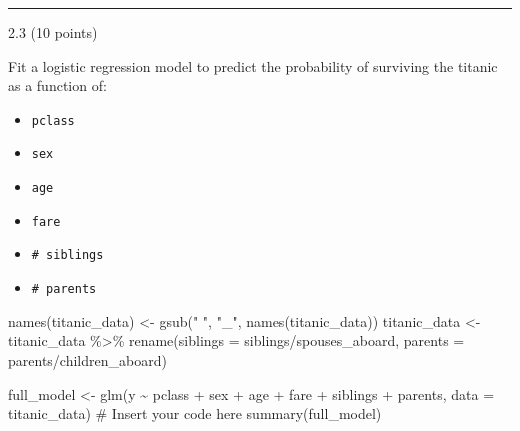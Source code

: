 \documentclass[
  letterpaper,
  DIV=11,
  numbers=noendperiod]{scrartcl}
\newenvironment{Shaded}{\begin{snugshade}}{\end{snugshade}}
\newcommand{\AttributeTok}[1]{\textcolor[rgb]{0.40,0.45,0.13}{#1}}
\newcommand{\CommentTok}[1]{\textcolor[rgb]{0.37,0.37,0.37}{#1}}
\newcommand{\FunctionTok}[1]{\textcolor[rgb]{0.28,0.35,0.67}{#1}}
\newcommand{\NormalTok}[1]{\textcolor[rgb]{0.00,0.23,0.31}{#1}}
\newcommand{\OtherTok}[1]{\textcolor[rgb]{0.00,0.23,0.31}{#1}}
\newcommand{\SpecialCharTok}[1]{\textcolor[rgb]{0.37,0.37,0.37}{#1}}
\newcommand{\StringTok}[1]{\textcolor[rgb]{0.13,0.47,0.30}{#1}}
\providecommand{\tightlist}{%
  \setlength{\itemsep}{0pt}\setlength{\parskip}{0pt}}\usepackage{longtable,booktabs,array}
\begin{document}
\begin{center}\rule{0.5\linewidth}{0.5pt}\end{center}

2.3 (10 points)

Fit a logistic regression model to predict the probability of surviving
the titanic as a function of:

\begin{itemize}
\tightlist
\item
  \texttt{pclass}
\item
  \texttt{sex}
\item
  \texttt{age}
\item
  \texttt{fare}
\item
  \texttt{\#\ siblings}
\item
  \texttt{\#\ parents}
\end{itemize}

\begin{Shaded}
\begin{Highlighting}[]
\FunctionTok{names}\NormalTok{(titanic\_data) }\OtherTok{\textless{}{-}} \FunctionTok{gsub}\NormalTok{(}\StringTok{" "}\NormalTok{, }\StringTok{"\_"}\NormalTok{, }\FunctionTok{names}\NormalTok{(titanic\_data))}
\NormalTok{titanic\_data }\OtherTok{\textless{}{-}}\NormalTok{ titanic\_data }\SpecialCharTok{\%\textgreater{}\%}
  \FunctionTok{rename}\NormalTok{(}\AttributeTok{siblings =} \StringTok{\textasciigrave{}}\AttributeTok{siblings/spouses\_aboard}\StringTok{\textasciigrave{}}\NormalTok{, }\AttributeTok{parents =} \StringTok{\textasciigrave{}}\AttributeTok{parents/children\_aboard}\StringTok{\textasciigrave{}}\NormalTok{)}
\end{Highlighting}
\end{Shaded}

\begin{Shaded}
\begin{Highlighting}[]
\NormalTok{full\_model }\OtherTok{\textless{}{-}} \FunctionTok{glm}\NormalTok{(y }\SpecialCharTok{\textasciitilde{}}\NormalTok{ pclass }\SpecialCharTok{+}\NormalTok{ sex }\SpecialCharTok{+}\NormalTok{ age }\SpecialCharTok{+}\NormalTok{ fare }\SpecialCharTok{+}\NormalTok{ siblings }\SpecialCharTok{+}\NormalTok{ parents, }
                  \AttributeTok{data =}\NormalTok{ titanic\_data) }\CommentTok{\# Insert your code here}
\FunctionTok{summary}\NormalTok{(full\_model)}
\end{Highlighting}
\end{Shaded}
\end{document}
